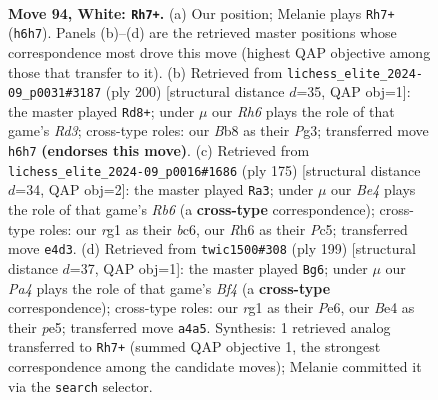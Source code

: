 \documentclass[11pt]{article}
\begin{document}
\clearpage

\begin{figure}[p]\centering
\begin{subfigure}{0.46\textwidth}\centering
\resizebox{\linewidth}{!}{%
\newchessgame
\chessboard[
  setfen={1B6/6k1/1P5R/3N4/P3B1b1/1K5p/8/6r1 w - - 9 94},
  showmover=false,
  pgfstyle=straightmove, color=movearrow, markmove={h6-h7}
]}
\caption{}
\end{subfigure}\hfill
\begin{subfigure}{0.46\textwidth}\centering
\resizebox{\linewidth}{!}{%
\newchessgame
\chessboard[
  setfen={4k3/8/4r3/2P3Bp/1K6/3R2P1/6b1/8 w - - 17 101},
  showmover=false,
  pgfstyle=straightmove, color=movearrow, markmove={d3-d8}
]}
\caption{}
\end{subfigure}
\\[4pt]
\begin{subfigure}{0.46\textwidth}\centering
\resizebox{\linewidth}{!}{%
\newchessgame
\chessboard[
  setfen={8/6kp/2B5/2p2b2/1pP2P2/1r6/4K3/8 b - - 3 88},
  showmover=false,
  pgfstyle=straightmove, color=movearrow, markmove={b3-a3}
]}
\caption{}
\end{subfigure}\hfill
\begin{subfigure}{0.46\textwidth}\centering
\resizebox{\linewidth}{!}{%
\newchessgame
\chessboard[
  setfen={8/8/1k1Bp3/4Pb2/r5p1/2R3K1/8/8 b - - 71 100},
  showmover=false,
  pgfstyle=straightmove, color=movearrow, markmove={f5-g6}
]}
\caption{}
\end{subfigure}
\caption{\textbf{Move 94, White: \texttt{Rh7+}.} (a) Our position; Melanie plays \texttt{Rh7+} (\texttt{h6h7}). Panels (b)--(d) are the retrieved master positions whose correspondence most drove this move (highest QAP objective among those that transfer to it). (b) Retrieved from \texttt{lichess\_elite\_2024-09\_p0031\#3187} (ply 200) [structural distance $d$=35, QAP obj=1]: the master played \texttt{Rd8+}; under $\mu$ our \emph{Rh6} plays the role of that game's \emph{Rd3}; cross-type roles: our \emph{B}b8 as their \emph{P}g3; transferred move \texttt{h6h7} \textbf{(endorses this move)}. (c) Retrieved from \texttt{lichess\_elite\_2024-09\_p0016\#1686} (ply 175) [structural distance $d$=34, QAP obj=2]: the master played \texttt{Ra3}; under $\mu$ our \emph{Be4} plays the role of that game's \emph{Rb6} (a \textbf{cross-type} correspondence); cross-type roles: our \emph{r}g1 as their \emph{b}c6, our \emph{R}h6 as their \emph{P}c5; transferred move \texttt{e4d3}. (d) Retrieved from \texttt{twic1500\#308} (ply 199) [structural distance $d$=37, QAP obj=1]: the master played \texttt{Bg6}; under $\mu$ our \emph{Pa4} plays the role of that game's \emph{Bf4} (a \textbf{cross-type} correspondence); cross-type roles: our \emph{r}g1 as their \emph{P}e6, our \emph{B}e4 as their \emph{p}e5; transferred move \texttt{a4a5}. Synthesis: 1 retrieved analog transferred to \texttt{Rh7+} (summed QAP objective 1, the strongest correspondence among the candidate moves); Melanie committed it via the \texttt{search} selector.}
\label{fig:thought-m186}
\end{figure}
\end{document}
